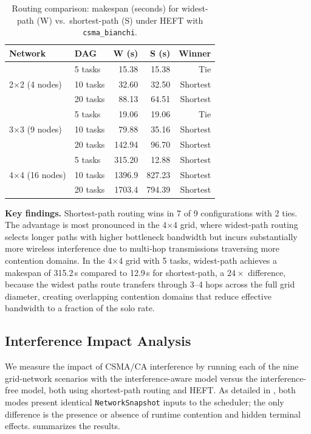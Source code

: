 \documentclass[conference]{IEEEtran}
\begin{document}
\begin{table}[t]
\centering
\caption{Routing comparison: makespan (seconds) for widest-path (W) vs.\
shortest-path (S) under HEFT with \texttt{csma\_bianchi}.}
\label{tab:routing}
\begin{tabular}{@{}llrrr@{}}
\toprule
\textbf{Network} & \textbf{DAG} & \textbf{W (s)} & \textbf{S (s)} & \textbf{Winner} \\
\midrule
\multirow{3}{*}{2$\times$2 (4 nodes)}
  & 5 tasks   & 15.38  & 15.38  & Tie \\
  & 10 tasks  & 32.60  & 32.50  & Shortest \\
  & 20 tasks  & 88.13  & 64.51  & Shortest \\
\midrule
\multirow{3}{*}{3$\times$3 (9 nodes)}
  & 5 tasks   & 19.06  & 19.06  & Tie \\
  & 10 tasks  & 79.88  & 35.16  & Shortest \\
  & 20 tasks  & 142.94 & 96.70  & Shortest \\
\midrule
\multirow{3}{*}{4$\times$4 (16 nodes)}
  & 5 tasks   & 315.20 & 12.88  & Shortest \\
  & 10 tasks  & 1396.9 & 827.23 & Shortest \\
  & 20 tasks  & 1703.4 & 794.39 & Shortest \\
\bottomrule
\end{tabular}
\end{table}

\textbf{Key findings.}
Shortest-path routing wins in 7 of 9 configurations with 2 ties.  The
advantage is most pronounced in the 4$\times$4 grid, where widest-path
routing selects longer paths with higher bottleneck bandwidth but incurs
substantially more wireless interference due to multi-hop transmissions
traversing more contention domains.  In the 4$\times$4 grid with 5 tasks,
widest-path achieves a makespan of 315.2\,s compared to 12.9\,s for
shortest-path, a $24\times$ difference, because the widest paths route
transfers through 3--4 hops across the full grid diameter, creating
overlapping contention domains that reduce effective bandwidth to a
fraction of the solo rate.


\subsection{Interference Impact Analysis}
\label{sec:interference_eval}

We measure the impact of CSMA/CA interference by running each of the nine
grid-network scenarios with the interference-aware model versus the
interference-free model, both using shortest-path routing and HEFT.
As detailed in \Cref{sec:scheduler_info}, both modes present identical
\texttt{NetworkSnapshot} inputs to the scheduler; the only difference is the
presence or absence of runtime contention and hidden terminal effects.
\Cref{tab:interference} summarizes the results.
\end{document}
